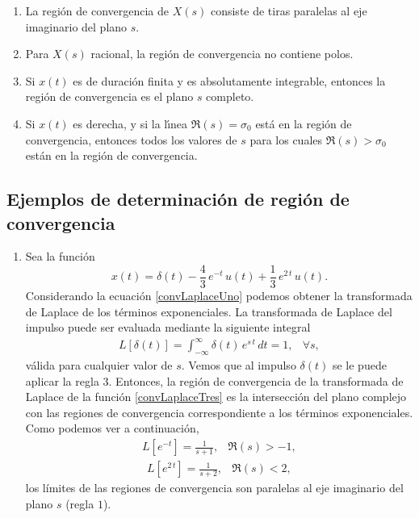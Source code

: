\begin{enumerate}
\item  La regi\'{o}n de convergencia de $X\left( s\right) $ consiste de
tiras paralelas al eje imaginario del plano $s.$

\item  Para $X\left( s\right) $ racional, la regi\'{o}n de convergencia no
contiene polos.

\item  Si $x\left( t\right) $ es de duraci\'{o}n finita y es absolutamente
integrable, entonces la regi\'{o}n de convergencia es el plano $s$ completo.

\item  Si $x(t)$ es derecha, y si la l\'{\i}nea $\Re\left( s\right)
=\sigma _{0}$ est\'{a} en la regi\'{o}n de convergencia, entonces todos los
valores de $s$ para los cuales $\Re\left( s\right) >\sigma _{0}$
est\'{a}n en la regi\'{o}n de convergencia.
\end{enumerate}

\subsection{Ejemplos de determinaci\'{o}n de regi\'{o}n de convergencia}

\begin{enumerate}
\item Sea la funci\'{o}n
\begin{equation}
  x(t) = \delta(t) - \frac{4}{3} \, e^{-t} \, u(t) + \frac{1}{3} \, e^{2 \, t} \, u(t). \label{convLaplaceTres}
\end{equation}
Considerando la ecuaci\'{o}n \ref{convLaplaceUno} podemos obtener la transformada de Laplace de los t\'{e}rminos exponenciales.
La transformada de Laplace del impulso puede ser evaluada mediante la siguiente integral
\begin{equation}
  \begin{array}{cc}
     L[\delta(t)] = \int_{-\infty}^{\infty} \delta(t) \, e^{s \, t} \, dt = 1, & \forall s,
  \end{array}
\end{equation}
v\'{a}lida para cualquier valor de $s$. Vemos que al impulso $\delta(t)$ se le puede aplicar la regla $3$. Entonces, la regi\'{o}n de convergencia de la transformada de Laplace de la funci\'{o}n \ref{convLaplaceTres} es la intersecci\'{o}n del plano complejo con las regiones de convergencia correspondiente a los t\'{e}rminos exponenciales. Como podemos ver a continuaci\'{o}n,
\begin{equation}
  \begin{array}{cc}
     L[e^{-t}] = \frac{1}{s + 1}, & \Re{(s)} > -1,
  \end{array}
\end{equation}
\begin{equation}
  \begin{array}{cc}
     L[e^{2 \, t}] = \frac{1}{s + 2}, & \Re{(s)} < 2,
  \end{array}
\end{equation}
los l\'{i}mites de las regiones de convergencia son paralelas al eje imaginario del plano $s$ (regla $1$).

\end{enumerate}


